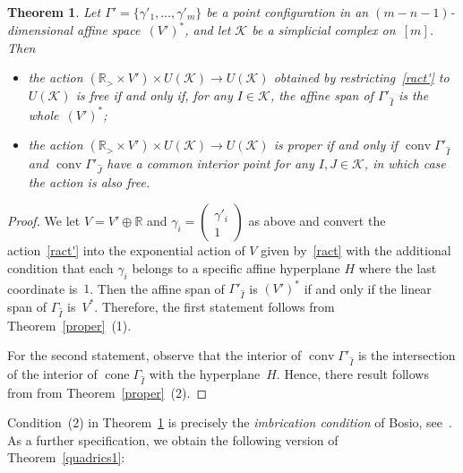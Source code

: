 \documentclass[a4paper]{amsart}
\newtheorem{theorem}{Theorem}[section]
\theoremstyle{definition}
\theoremstyle{remark}
\numberwithin{equation}{section}
\def\R{\mathbb R}
\def\R{\mathbb R}
\def\sK{\mathcal K}
\def\cone{\mathop{\mathrm{cone}}}
\def\conv{\mathop{\mathrm{conv}}}
\newcommand{\<}{\langle}
\renewcommand{\>}{\rangle}
\begin{document}
\begin{theorem}\label{proper'}
Let $\Gamma'=\{\gamma'_1,\ldots,\gamma'_m\}$ be a point configuration in an $(m-n-1)$-dimensional affine space~$(V')^*$, and let $\sK$ be a simplicial complex on~$[m]$. Then
\begin{itemize}
\item[(1)] the action $(\R_>\times V')\times U(\sK)\to U(\sK)$ obtained by restricting~\eqref{ract'} to $U(\sK)$ is free if and only if,  for any $I\in\sK$,
the affine span of $\Gamma'_{\widehat I}$ is the whole~$(V')^*$;

\item[(2)] the action $(\R_>\times V')\times U(\sK)\to U(\sK)$ is proper if and only if
$\conv\Gamma'_{\widehat I}$ and $\conv\Gamma'_{\widehat J}$ have a common interior point for any $I,J\in\sK$, in which case the action is also free.
\end{itemize}
\end{theorem}
\begin{proof}
We let $V=V'\oplus\R$ and $\gamma_i=\begin{pmatrix}\gamma'_i\\1\end{pmatrix}$ as above and convert the action~\eqref{ract'} into the exponential action of $V$ given by~\eqref{ract} with the additional condition that each $\gamma_i$ belongs to a specific affine hyperplane $H$ where the last coordinate is~$1$. Then the affine span of $\Gamma'_{\widehat I}$ is $(V')^*$ if and only if the linear span of $\Gamma_{\widehat I}$ is~$V^*$. Therefore, the first statement follows from Theorem~\ref{proper}~(1).

For the second statement, observe that the interior of $\conv\Gamma'_{\widehat I}$ is the intersection of the interior of $\cone\Gamma_{\widehat I}$ with the hyperplane~$H$. Hence, there result follows from from Theorem~\ref{proper}~(2).
\end{proof}

Condition~(2) in Theorem~\ref{proper'} is precisely the \emph{imbrication condition} of Bosio, see~\cite[Lemma~1.1, Definition~1.8]{bosi01}. As a further specification, we obtain the following version of Theorem~\ref{quadrics1}:
\end{document}

